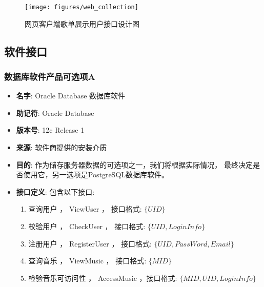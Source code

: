 \begin{enumerate}
\begin{figure}[h!]
  \centering

  \texttt{[image: figures/web\_collection]}

  \caption{  \label{fig:web_collection}
  		网页客户端歌单展示用户接口设计图
    }
\end{figure}

\subsection{软件接口}

\subsubsection{数据库软件产品可选项A} %
\begin{itemize}
	\item \textbf{名字}: 
		Oracle Database 数据库软件
	\item \textbf{助记符}: 
		Oracle Database
	\item \textbf{版本号}: 
		12c Release 1
	\item \textbf{来源}: 
		软件商提供的安装介质
	\item \textbf{目的}: 
		作为储存服务器数据的可选项之一，我们将根据实际情况，
			最终决定是否使用它，另一选项是PostgreSQL数据库软件。
	\item \textbf{接口定义}: 
		包含以下接口: 
		\begin{enumerate}
			\item 查询用户 ， ViewUser   ， 接口格式: $\{ UID \}$
			\item 校验用户 ， CheckUser  ， 接口格式: $\{ UID, LoginInfo \}$
			\item 注册用户 ， RegisterUser  ， 接口格式: $\{ UID,  PassWord, Email\}$
			\item 查询音乐 ， ViewMusic  ， 接口格式: $\{ MID \}$
			\item 检验音乐可访问性 ， AccessMusic ，接口格式:  $\{ MID, UID, LoginInfo \}$ 
		\end{enumerate}
\end{itemize}


\end{enumerate}
